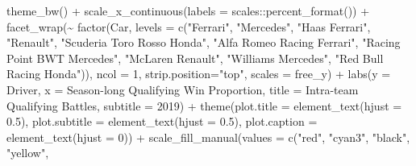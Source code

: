 \documentclass[
]{book}
\newenvironment{Shaded}{\begin{snugshade}}{\end{snugshade}}
\newcommand{\AttributeTok}[1]{\textcolor[rgb]{0.77,0.63,0.00}{#1}}
\newcommand{\DecValTok}[1]{\textcolor[rgb]{0.00,0.00,0.81}{#1}}
\newcommand{\FloatTok}[1]{\textcolor[rgb]{0.00,0.00,0.81}{#1}}
\newcommand{\FunctionTok}[1]{\textcolor[rgb]{0.00,0.00,0.00}{#1}}
\newcommand{\NormalTok}[1]{#1}
\newcommand{\SpecialCharTok}[1]{\textcolor[rgb]{0.00,0.00,0.00}{#1}}
\newcommand{\StringTok}[1]{\textcolor[rgb]{0.31,0.60,0.02}{#1}}
\begin{document}
\begin{Shaded}
\begin{Highlighting}[]
  \FunctionTok{theme\_bw}\NormalTok{() }\SpecialCharTok{+}
  \FunctionTok{scale\_x\_continuous}\NormalTok{(}\AttributeTok{labels =}\NormalTok{ scales}\SpecialCharTok{::}\FunctionTok{percent\_format}\NormalTok{()) }\SpecialCharTok{+}
  \FunctionTok{facet\_wrap}\NormalTok{(}\SpecialCharTok{\textasciitilde{}} \FunctionTok{factor}\NormalTok{(Car,}
                      \AttributeTok{levels =} \FunctionTok{c}\NormalTok{(}\StringTok{"Ferrari"}\NormalTok{,}
                                 \StringTok{"Mercedes"}\NormalTok{,}
                                 \StringTok{"Haas Ferrari"}\NormalTok{,}
                                 \StringTok{"Renault"}\NormalTok{,}
                                 \StringTok{"Scuderia Toro Rosso Honda"}\NormalTok{,}
                                 \StringTok{"Alfa Romeo Racing Ferrari"}\NormalTok{, }
                                 \StringTok{"Racing Point BWT Mercedes"}\NormalTok{,}
                                 \StringTok{"McLaren Renault"}\NormalTok{,}
                                 \StringTok{"Williams Mercedes"}\NormalTok{,}
                                 \StringTok{"Red Bull Racing Honda"}\NormalTok{)), }\AttributeTok{ncol =} \DecValTok{1}\NormalTok{, }\AttributeTok{strip.position=}\StringTok{"top"}\NormalTok{, }\AttributeTok{scales =} \StringTok{\textquotesingle{}free\_y\textquotesingle{}}\NormalTok{) }\SpecialCharTok{+}
  \FunctionTok{labs}\NormalTok{(}\AttributeTok{y =} \StringTok{\textquotesingle{}Driver\textquotesingle{}}\NormalTok{,}
       \AttributeTok{x =} \StringTok{\textquotesingle{}Season{-}long Qualifying Win Proportion\textquotesingle{}}\NormalTok{,}
       \AttributeTok{title =} \StringTok{\textquotesingle{}Intra{-}team Qualifying Battles\textquotesingle{}}\NormalTok{,}
       \AttributeTok{subtitle =} \StringTok{\textquotesingle{}2019\textquotesingle{}}\NormalTok{) }\SpecialCharTok{+}
  \FunctionTok{theme}\NormalTok{(}\AttributeTok{plot.title =} \FunctionTok{element\_text}\NormalTok{(}\AttributeTok{hjust =} \FloatTok{0.5}\NormalTok{),}
        \AttributeTok{plot.subtitle =} \FunctionTok{element\_text}\NormalTok{(}\AttributeTok{hjust =} \FloatTok{0.5}\NormalTok{),}
        \AttributeTok{plot.caption =} \FunctionTok{element\_text}\NormalTok{(}\AttributeTok{hjust =} \DecValTok{0}\NormalTok{)) }\SpecialCharTok{+}
  \FunctionTok{scale\_fill\_manual}\NormalTok{(}\AttributeTok{values =} \FunctionTok{c}\NormalTok{(}\StringTok{"red"}\NormalTok{, }
                                \StringTok{"cyan3"}\NormalTok{,  }
                                \StringTok{"black"}\NormalTok{, }
                                \StringTok{"yellow"}\NormalTok{,}

\end{Highlighting}
\end{Shaded}
\end{document}
